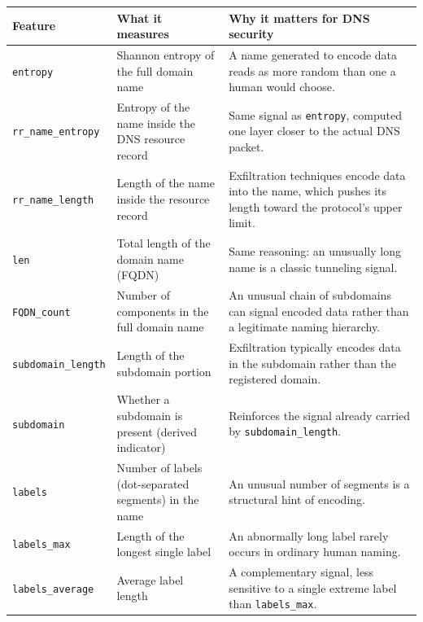 \documentclass[12pt,a4paper]{report}
\begin{document}
\begin{table}[h]
\centering
\small
\begin{tabular}{@{}p{3cm}p{4.8cm}p{5.5cm}@{}}
\toprule
\textbf{Feature} & \textbf{What it measures} & \textbf{Why it matters for DNS security} \\
\midrule
\texttt{entropy} & Shannon entropy of the full domain name & A name generated to encode data reads as more random than one a human would choose. \\

\texttt{rr\_name\_entropy} & Entropy of the name inside the DNS resource record & Same signal as \texttt{entropy}, computed one layer closer to the actual DNS packet. \\

\texttt{rr\_name\_length} & Length of the name inside the resource record & Exfiltration techniques encode data into the name, which pushes its length toward the protocol's upper limit. \\

\texttt{len} & Total length of the domain name (FQDN) & Same reasoning: an unusually long name is a classic tunneling signal. \\

\texttt{FQDN\_count} & Number of components in the full domain name & An unusual chain of subdomains can signal encoded data rather than a legitimate naming hierarchy. \\

\texttt{subdomain\_length} & Length of the subdomain portion & Exfiltration typically encodes data in the subdomain rather than the registered domain. \\

\texttt{subdomain} & Whether a subdomain is present (derived indicator) & Reinforces the signal already carried by \texttt{subdomain\_length}. \\

\texttt{labels} & Number of labels (dot-separated segments) in the name & An unusual number of segments is a structural hint of encoding. \\

\texttt{labels\_max} & Length of the longest single label & An abnormally long label rarely occurs in ordinary human naming. \\

\texttt{labels\_average} & Average label length & A complementary signal, less sensitive to a single extreme label than \texttt{labels\_max}. \\


\end{tabular}
\end{table}
\end{document}
